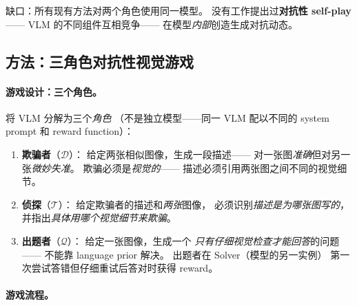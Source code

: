 \documentclass[12pt,a4paper]{article}
\begin{document}
\noindent
缺口：所有现有方法对两个角色使用同一模型。
没有工作提出过\textbf{对抗性 self-play}——
VLM 的不同组件互相竞争——
在模型\textit{内部}创造生成对抗动态。

\subsection{方法：三角色对抗性视觉游戏}

\paragraph{游戏设计：三个角色。}

将 VLM 分解为三个\textit{角色}
（不是独立模型——同一 VLM 配以不同的 system prompt 和 reward function）：

\begin{enumerate}[leftmargin=2em]
  \item \textbf{欺骗者}（$\mathcal{D}$）：
    给定两张相似图像，生成一段描述——
    对一张图\textit{准确}但对另一张\textit{微妙失准}。
    欺骗必须是\textit{视觉的}——
    描述必须引用两张图之间不同的视觉细节。

  \item \textbf{侦探}（$\mathcal{T}$）：
    给定欺骗者的描述和\textit{两张}图像，
    必须识别\textit{描述是为哪张图写的}，
    并指出\textit{具体用哪个视觉细节来欺骗}。

  \item \textbf{出题者}（$\mathcal{Q}$）：
    给定一张图像，生成一个
    \textit{只有仔细视觉检查才能回答}的问题——
    不能靠 language prior 解决。
    出题者在 Solver（模型的另一实例）
    第一次尝试答错但仔细重试后答对时获得 reward。
\end{enumerate}

\paragraph{游戏流程。}
\end{document}

